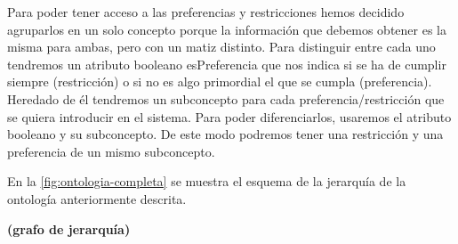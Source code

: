 Para poder tener acceso a las preferencias y restricciones hemos decidido
agruparlos en un solo concepto porque la información que debemos obtener es
la misma para ambas, pero con un matiz distinto. Para distinguir entre cada
uno tendremos un atributo booleano esPreferencia que  nos indica si se ha
de cumplir siempre (restricción) o si no es algo primordial el que se cumpla
(preferencia). Heredado de él tendremos un subconcepto para cada
preferencia/restricción que se quiera introducir en el sistema. Para poder
diferenciarlos, usaremos el atributo booleano y su subconcepto. De este modo
podremos tener una restricción y una preferencia de un mismo subconcepto.

En la \autoref{fig:ontologia-completa} se muestra el esquema de la jerarquía 
de la ontología anteriormente descrita.




\textbf{(grafo de jerarquía)}
